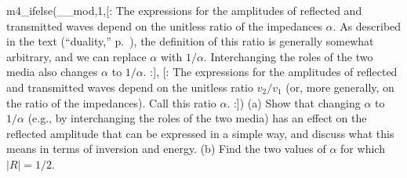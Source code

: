 m4_ifelse(__mod,1,[:%
The expressions for the amplitudes of reflected and transmitted waves
depend on the unitless ratio of the impedances $\alpha$. As described in the text (``duality,'' p.~\pageref{impedance-duality}), the definition of
this ratio is generally somewhat arbitrary, and we can replace $\alpha$ with $1/\alpha$.
Interchanging the roles of the two media also changes $\alpha$ to $1/\alpha$.
:],
[:%
The expressions for the amplitudes of reflected and transmitted waves
depend on the unitless ratio $v_2/v_1$ (or, more generally, on the ratio
of the impedances). Call this ratio $\alpha$.
:])%
(a) Show that changing $\alpha$ to $1/\alpha$ (e.g., by interchanging the
roles of the two media) has an effect on the reflected amplitude that
can be expressed in a simple way, and discuss what this means in terms
of inversion and energy.
(b) Find the two values of $\alpha$ for which $|R|=1/2$.
